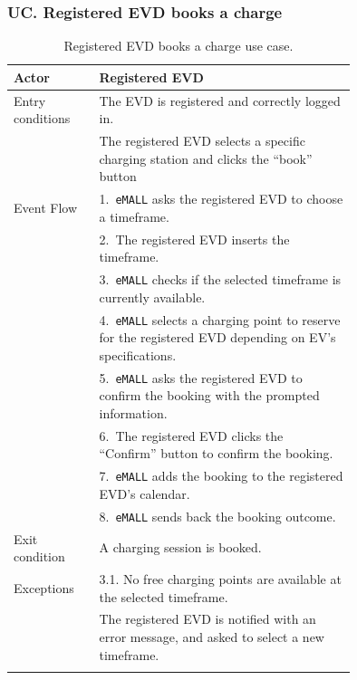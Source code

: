 \subsubsection*{UC\cuc . Registered EVD books a charge}
\begin{center}
    \begin{longtable}{lp{0.75\linewidth}}
        \hline
        Actor            & Registered EVD                                                                                                \\
        \hline
        Entry conditions & The EVD is registered and correctly logged in.                                                                \\
        & The registered EVD selects a specific charging station and clicks the ``book'' button                         \\
        \hline
        Event Flow       & 1.\ \verb|eMALL| asks the registered EVD to choose a timeframe.                                               \\
        & 2.\ The registered EVD inserts the timeframe.                                                                 \\
        & 3.\ \verb|eMALL| checks if the selected timeframe is currently available.                                     \\
        & 4.\ \verb|eMALL| selects a charging point to reserve for the registered EVD depending on EV's specifications. \\
        & 5.\ \verb|eMALL| asks the registered EVD to confirm the booking with the prompted information.                \\
        & 6.\ The registered EVD clicks the ``Confirm'' button to confirm the booking.                                  \\
        & 7.\ \verb|eMALL| adds the booking to the registered EVD's calendar.                                           \\
        & 8.\ \verb|eMALL| sends back the booking outcome.                                                              \\
        \hline
        Exit condition   & A charging session is booked.                                                                                 \\
        \hline
        Exceptions       & 3.1. No free charging points are available at the selected timeframe.                                         \\
        & The registered EVD is notified with an error message, and asked to select a new timeframe.                    \\
        \hline
        \caption{Registered EVD books a charge use case.}
        \label{tab: EVD_booking_use_case}
    \end{longtable}


\end{center}
